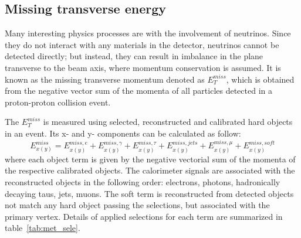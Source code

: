 \subsection{Missing transverse energy}

Many interesting physics processes are with the involvement of neutrinos.
Since they do not interact with any materials in the detector, neutrinos cannot be detected directly;
but instead, they can result in imbalance in the plane transverse to the beam axis, where momentum conservation is assumed.
It is known as the missing transverse momentum denoted as $E_{T}^{miss}$,
which is obtained from the negative vector sum of the momenta of all particles detected in a proton-proton collision event.

The $E_{T}^{miss}$ is measured using selected, reconstructed and calibrated hard objects in an event.
Its x- and y- components can be calculated as follow:
\begin{equation} \label{eq:met_xy}
	E_{x(y)}^{miss} = E_{x(y)}^{miss, e} + E_{x(y)}^{miss, \gamma} + E_{x(y)}^{miss, \tau} + E_{x(y)}^{miss, jets} + E_{x(y)}^{miss, \mu} + E_{x(y)}^{miss, soft}
\end{equation}
where each object term is given by the negative vectorial sum of the momenta of the respective calibrated objects.
The calorimeter signals are associated with the reconstructed objects in the following order: electrons, photons, hadronically decaying taus, jets, muons.
The soft term is reconstructed from detected objects not match any hard object passing the selections, but associated with the primary vertex.
Details of applied selections for each term are summarized in table~\ref{tab:met_sele}.
